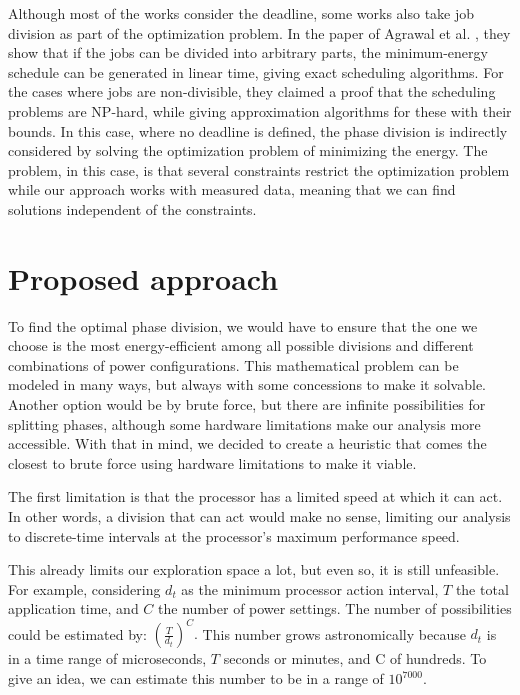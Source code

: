 Although most of the works consider the deadline, some works also take job division as part of the optimization problem. In the paper of Agrawal et al. \cite{Agrawal2021}, they show that if the jobs can be divided into arbitrary parts, the minimum-energy schedule can be generated in linear time, giving exact scheduling algorithms. For the cases where jobs are non-divisible, they claimed a proof that the scheduling problems are NP-hard, while giving approximation algorithms for these with their bounds.
In this case, where no deadline is defined, the phase division is indirectly considered by solving the optimization problem of minimizing the energy. The problem, in this case, is that several constraints restrict the optimization problem while our approach works with measured data, meaning that we can find solutions independent of the constraints.

\section{Proposed approach} \label{sec:proposed_approach}
To find the optimal phase division, we would have to ensure that the one we choose is the most energy-efficient among all possible divisions and different combinations of power configurations.
This mathematical problem can be modeled in many ways, but always with some concessions to make it solvable. Another option would be by brute force, but there are infinite possibilities for splitting phases, although some hardware limitations make our analysis more accessible. With that in mind, we decided to create a heuristic that comes the closest to brute force using hardware limitations to make it viable.

The first limitation is that the processor has a limited speed at which it can act. In other words, a division that can act would make no sense, limiting our analysis to discrete-time intervals at the processor's maximum performance speed.

This already limits our exploration space a lot, but even so, it is still unfeasible. For example, considering $d_t$ as the minimum processor action interval, $T$ the total application time, and $C$ the number of power settings. The number of possibilities could be estimated by:
$ \left(\frac{T}{d_t}\right)^C.$
This number grows astronomically because $d_t$ is in a time range of microseconds, $T$ seconds or minutes, and C of hundreds. To give an idea, we can estimate this number to be in a range of $10^{7000}$.

